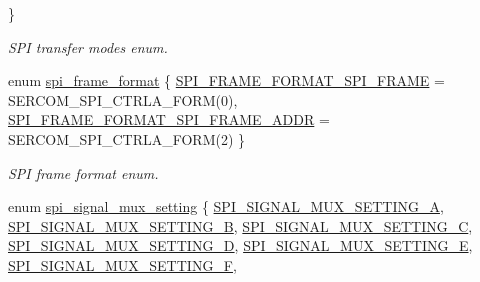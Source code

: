 \begin{DoxyCompactItemize}
 \}
\begin{DoxyCompactList}\small\item\em S\+PI transfer modes enum. \end{DoxyCompactList}\item 
enum \mbox{\hyperlink{group__asfdoc__sam0__sercom__spi__group_ga4598fb059ff90fccf8c9fa5b421f1bda}{spi\+\_\+frame\+\_\+format}} \{ \mbox{\hyperlink{group__asfdoc__sam0__sercom__spi__group_gga4598fb059ff90fccf8c9fa5b421f1bdaa9dbfeaf1014b44745b56ceda7e0d62d7}{S\+P\+I\+\_\+\+F\+R\+A\+M\+E\+\_\+\+F\+O\+R\+M\+A\+T\+\_\+\+S\+P\+I\+\_\+\+F\+R\+A\+ME}} = S\+E\+R\+C\+O\+M\+\_\+\+S\+P\+I\+\_\+\+C\+T\+R\+L\+A\+\_\+\+F\+O\+RM(0), 
\mbox{\hyperlink{group__asfdoc__sam0__sercom__spi__group_gga4598fb059ff90fccf8c9fa5b421f1bdaaba876059c4eb058d0988262d9df8e090}{S\+P\+I\+\_\+\+F\+R\+A\+M\+E\+\_\+\+F\+O\+R\+M\+A\+T\+\_\+\+S\+P\+I\+\_\+\+F\+R\+A\+M\+E\+\_\+\+A\+D\+DR}} = S\+E\+R\+C\+O\+M\+\_\+\+S\+P\+I\+\_\+\+C\+T\+R\+L\+A\+\_\+\+F\+O\+RM(2)
 \}
\begin{DoxyCompactList}\small\item\em S\+PI frame format enum. \end{DoxyCompactList}\item 
enum \mbox{\hyperlink{group__asfdoc__sam0__sercom__spi__group_ga420e19efe4a923eb9ab6dc619a23c370}{spi\+\_\+signal\+\_\+mux\+\_\+setting}} \{ \newline
\mbox{\hyperlink{group__asfdoc__sam0__sercom__spi__group_gga420e19efe4a923eb9ab6dc619a23c370a3cdcdd92d89e38733d77ac89f1a2ddd2}{S\+P\+I\+\_\+\+S\+I\+G\+N\+A\+L\+\_\+\+M\+U\+X\+\_\+\+S\+E\+T\+T\+I\+N\+G\+\_\+A}}, 
\mbox{\hyperlink{group__asfdoc__sam0__sercom__spi__group_gga420e19efe4a923eb9ab6dc619a23c370a6436816e953e9435937dadd832022e23}{S\+P\+I\+\_\+\+S\+I\+G\+N\+A\+L\+\_\+\+M\+U\+X\+\_\+\+S\+E\+T\+T\+I\+N\+G\+\_\+B}}, 
\mbox{\hyperlink{group__asfdoc__sam0__sercom__spi__group_gga420e19efe4a923eb9ab6dc619a23c370aedcff238d013e3a51eb6580ca3df64d1}{S\+P\+I\+\_\+\+S\+I\+G\+N\+A\+L\+\_\+\+M\+U\+X\+\_\+\+S\+E\+T\+T\+I\+N\+G\+\_\+C}}, 
\mbox{\hyperlink{group__asfdoc__sam0__sercom__spi__group_gga420e19efe4a923eb9ab6dc619a23c370a157acefdb388019c788d616f5225deda}{S\+P\+I\+\_\+\+S\+I\+G\+N\+A\+L\+\_\+\+M\+U\+X\+\_\+\+S\+E\+T\+T\+I\+N\+G\+\_\+D}}, 
\newline
\mbox{\hyperlink{group__asfdoc__sam0__sercom__spi__group_gga420e19efe4a923eb9ab6dc619a23c370a7234b3f4e0aa7fe723cc85edabea9816}{S\+P\+I\+\_\+\+S\+I\+G\+N\+A\+L\+\_\+\+M\+U\+X\+\_\+\+S\+E\+T\+T\+I\+N\+G\+\_\+E}}, 
\mbox{\hyperlink{group__asfdoc__sam0__sercom__spi__group_gga420e19efe4a923eb9ab6dc619a23c370a578bd6b0685f742bf51e9c2a395c3ea2}{S\+P\+I\+\_\+\+S\+I\+G\+N\+A\+L\+\_\+\+M\+U\+X\+\_\+\+S\+E\+T\+T\+I\+N\+G\+\_\+F}}, 

\end{DoxyCompactItemize}

